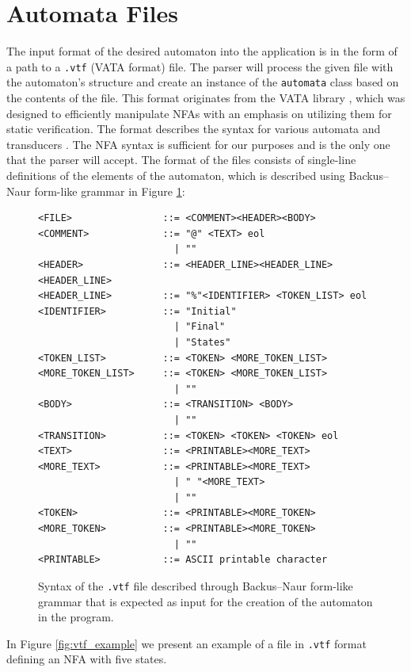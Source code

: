 \section{Automata Files}

The input format of the desired automaton into the application is in the form of a path to a \verb|.vtf| (VATA format) file. The parser will process the given file with the automaton’s structure and create an instance of the \verb|automata| class based on the contents of the file. This format originates from the VATA library \cite{VATA_lib}, which was designed to efficiently manipulate NFAs with an emphasis on utilizing them for static verification. The format describes the syntax for various automata and transducers \cite{VTF_files}. The NFA syntax is sufficient for our purposes and is the only one that the parser will accept. The format of the files consists of single-line definitions of the elements of the automaton, which is described using Backus–Naur form-like grammar in Figure \ref{fig:bnf_grammar}:

\begin{figure}[ht]
\label{fig:bnf_grammar}
\begin{verbatim}
<FILE>                ::= <COMMENT><HEADER><BODY>
<COMMENT>             ::= "@" <TEXT> eol
                        | ""
<HEADER>              ::= <HEADER_LINE><HEADER_LINE><HEADER_LINE>
<HEADER_LINE>         ::= "%"<IDENTIFIER> <TOKEN_LIST> eol
<IDENTIFIER>          ::= "Initial"
                        | "Final"
                        | "States"
<TOKEN_LIST>          ::= <TOKEN> <MORE_TOKEN_LIST>
<MORE_TOKEN_LIST>     ::= <TOKEN> <MORE_TOKEN_LIST>
                        | ""
<BODY>                ::= <TRANSITION> <BODY>
                        | ""
<TRANSITION>          ::= <TOKEN> <TOKEN> <TOKEN> eol
<TEXT>                ::= <PRINTABLE><MORE_TEXT>
<MORE_TEXT>           ::= <PRINTABLE><MORE_TEXT>
                        | " "<MORE_TEXT>
                        | ""
<TOKEN>               ::= <PRINTABLE><MORE_TOKEN>
<MORE_TOKEN>          ::= <PRINTABLE><MORE_TOKEN>
                        | ""
<PRINTABLE>           ::= ASCII printable character
\end{verbatim}
\caption{Syntax of the \texttt{.vtf} file described through Backus–Naur form-like grammar that is expected as input for the creation of the automaton in the program.}
\end{figure}

In Figure \ref{fig:vtf_example} we present an example of a file in \texttt{.vtf} format defining an NFA with five states.

